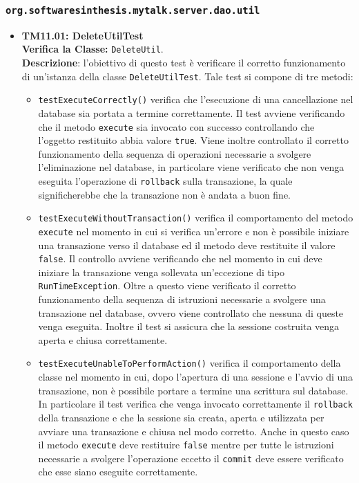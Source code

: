 \subsubsection{\texttt{org.softwaresinthesis.mytalk.server.dao.util}}
\begin{itemize}

\item \textbf{TM11.01: DeleteUtilTest}\\
\textbf{Verifica la Classe:} \texttt{DeleteUtil}.\\
\textbf{Descrizione}: l'obiettivo di questo test è verificare il corretto funzionamento di un'istanza della classe \texttt{DeleteUtilTest}.
Tale test si compone di tre metodi:
\begin{itemize}
\item \texttt{testExecuteCorrectly()} verifica che l'esecuzione di una cancellazione nel database sia portata a termine correttamente. Il test avviene verificando che il metodo \texttt{execute} sia invocato con successo controllando che l'oggetto restituito abbia valore \texttt{true}. Viene inoltre controllato il corretto funzionamento della sequenza di operazioni necessarie a svolgere l'eliminazione nel database, in particolare viene verificato che non venga eseguita l'operazione di \texttt{rollback} sulla transazione, la quale significherebbe che la transazione non è andata a buon fine.

\item \texttt{testExecuteWithoutTransaction()} verifica il comportamento del metodo\\ \texttt{execute} nel momento in cui si verifica un'errore e non è possibile iniziare una transazione verso il database ed il metodo deve restituite il valore \texttt{false}. Il controllo avviene verificando che nel momento in cui deve iniziare la transazione venga sollevata un'eccezione di tipo \texttt{RunTimeException}. Oltre a questo viene verificato il corretto funzionamento della sequenza di istruzioni necessarie a svolgere una transazione nel database, ovvero viene controllato che nessuna di queste venga eseguita. Inoltre il test si assicura che la sessione costruita venga aperta e chiusa correttamente.

\item \texttt{testExecuteUnableToPerformAction()} verifica il comportamento della classe nel momento in cui, dopo l'apertura di una sessione e l'avvio di una transazione, non è possibile portare a termine una scrittura sul database. In particolare il test verifica che venga invocato correttamente il \texttt{rollback} della transazione e che la sessione sia creata, aperta e utilizzata per avviare una transazione e chiusa nel modo corretto. Anche in questo caso il metodo \texttt{execute} deve restituire \texttt{false} mentre per tutte le istruzioni necessarie a svolgere l'operazione eccetto il \texttt{commit} deve essere verificato che esse siano eseguite correttamente.


\end{itemize}
\end{itemize}

